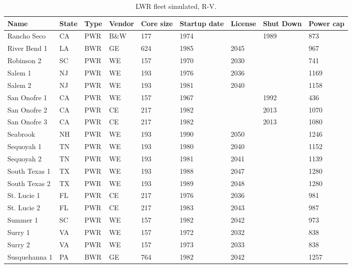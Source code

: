 \begin{table}[H]
    \centering
    \caption{LWR fleet simulated, R-V.}
    \label{tab:lwr_fleet4}
    \begin{tabular}{l l l l l l l l l}
    \hline
    \textbf{Name} & \textbf{State} & \textbf{Type} & \textbf{Vendor} & \textbf{Core size} & \textbf{Startup date} & \textbf{License} & \textbf{Shut Down} & \textbf{Power cap} \\
    \hline
    Rancho Seco         & CA & PWR & B\&W & 177 & 1974 &      & 1989 & 873 \\
    River Bend 1        & LA & BWR & GE   & 624 & 1985 & 2045 &      & 967 \\
    Robinson 2          & SC & PWR & WE   & 157 & 1970 & 2030 &      & 741 \\
    Salem 1             & NJ & PWR & WE   & 193 & 1976 & 2036 &      & 1169\\
    Salem 2             & NJ & PWR & WE   & 193 & 1981 & 2040 &      & 1158\\
    San Onofre 1        & CA & PWR & WE   & 157 & 1967 &      & 1992 & 436 \\
    San Onofre 2        & CA & PWR & CE   & 217 & 1982 &      & 2013 & 1070\\
    San Onofre 3        & CA & PWR & CE   & 217 & 1982 &      & 2013 & 1080\\
    Seabrook            & NH & PWR & WE   & 193 & 1990 & 2050 &      & 1246\\
    Sequoyah 1          & TN & PWR & WE   & 193 & 1980 & 2040 &      & 1152\\
    Sequoyah 2          & TN & PWR & WE   & 193 & 1981 & 2041 &      & 1139\\
    South Texas 1       & TX & PWR & WE   & 193 & 1988 & 2047 &      & 1280\\
    South Texas 2       & TX & PWR & WE   & 193 & 1989 & 2048 &      & 1280\\
    St. Lucie 1         & FL & PWR & CE   & 217 & 1976 & 2036 &      & 981 \\
    St. Lucie 2         & FL & PWR & CE   & 217 & 1983 & 2043 &      & 987 \\
    Summer 1            & SC & PWR & WE   & 157 & 1982 & 2042 &      & 973 \\
    Surry 1             & VA & PWR & WE   & 157 & 1972 & 2032 &      & 838 \\
    Surry 2             & VA & PWR & WE   & 157 & 1973 & 2033 &      & 838 \\
    Susquehanna 1       & PA & BWR & GE   & 764 & 1982 & 2042 &      & 1257 \\

\end{tabular}
\end{table}
